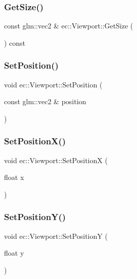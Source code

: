 \subsubsection{\texorpdfstring{Get\+Size()}{GetSize()}}
{\footnotesize\ttfamily const glm\+::vec2 \& ec\+::\+Viewport\+::\+Get\+Size (\begin{DoxyParamCaption}{ }\end{DoxyParamCaption}) const}

\mbox{\label{classec_1_1_viewport_a880a53af6b1b80bd30dec3da38e4a653}} 
\subsubsection{\texorpdfstring{Set\+Position()}{SetPosition()}}
{\footnotesize\ttfamily void ec\+::\+Viewport\+::\+Set\+Position (\begin{DoxyParamCaption}\item[{const glm\+::vec2 \&}]{position }\end{DoxyParamCaption})}

\mbox{\label{classec_1_1_viewport_a02f3a376956b1f7234efcaa26bedf064}} 
\subsubsection{\texorpdfstring{Set\+Position\+X()}{SetPositionX()}}
{\footnotesize\ttfamily void ec\+::\+Viewport\+::\+Set\+PositionX (\begin{DoxyParamCaption}\item[{float}]{x }\end{DoxyParamCaption})}

\mbox{\label{classec_1_1_viewport_abe18d636e8f53f087b3cb7a21699fb93}} 
\subsubsection{\texorpdfstring{Set\+Position\+Y()}{SetPositionY()}}
{\footnotesize\ttfamily void ec\+::\+Viewport\+::\+Set\+PositionY (\begin{DoxyParamCaption}\item[{float}]{y }\end{DoxyParamCaption})}

